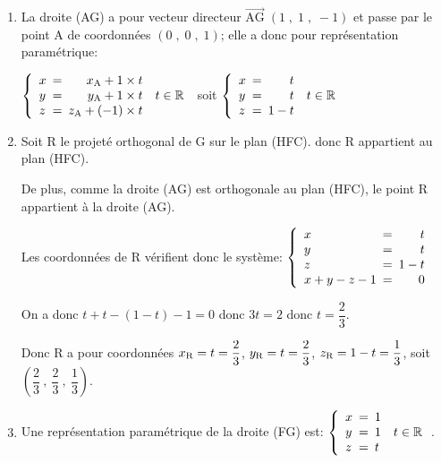\documentclass[10pt]{article}
\providecommand{\R}{\mathbb{R}}
\providecommand{\vectt}[1]{\overrightarrow{\mathrm{#1}}}
\begin{document}
\begin{enumerate}
\begin{enumerate}
$\begin{gathered}\vectt{FX}\perp\vectt{AG}
\iff \vectt{FX}\cdot\vectt{AG}=0
\iff (x-1)\times 1 + (y-1)\times 1 + (z-1)\times(-1)=0\\
\phantom{\vectt{FX}\perp\vectt{AG}}
\iff x-1+y-1-z+1=0
\iff x+y-z-1=0\end{gathered}$

Le plan (HFC) a donc pour équation cartésienne: $x+y-z-1=0$.

	\end{enumerate}
\item La droite (AG) a pour vecteur directeur $\vectt{AG}\;\left (1\;,\;1\;,\;-1 \right )$ et passe par le point A de coordonnées $\left ( 0\;,\;0\;,\;1\right )$; elle a donc pour représentation paramétrique:

$\left \{
\begin{array}{l !{=} r l}
x & x_{\text A} + 1\times t\\
y & y_{\text A} + 1 \times t & t\in\R\\
z & z_{\text A} + (-1)\times t
\end{array}
\right .$
soit
$\left \{
\begin{array}{l !{=} r l}
x &  t\\
y &  t & t\in\R\\
z & 1- t
\end{array}
\right .$

\item 
Soit R le projeté orthogonal de G sur le plan (HFC). donc R appartient au plan (HFC).

De plus, comme la droite (AG) est orthogonale au plan (HFC), le point R appartient à la droite (AG).

Les coordonnées de R vérifient donc le système:
$\left \{
\begin{array}{l !{=} r}
x &  t\\
y &  t \\
z & 1- t\\
x+y-z-1 & 0
\end{array}
\right .$

On a donc $t+t-(1-t)-1=0$ donc $3t=2$ donc $t=\dfrac{2}{3}$.

Donc R a pour coordonnées $x_{\text R}=t=\dfrac{2}{3}$, $y_{\text R}=t=\dfrac{2}{3}$, $z_{\text R}=1-t=\dfrac{1}{3}$, soit $\left (\dfrac{2}{3}~,~\dfrac{2}{3}~,~\dfrac{1}{3}\right )$.
\item Une représentation paramétrique de la droite (FG) est:
$\left\{\begin{array}{l !{=} l l}
x&1\\
y&1 & t\in\R\\ 
z&t
\end{array}\right.$.


\end{enumerate}
\end{document}
